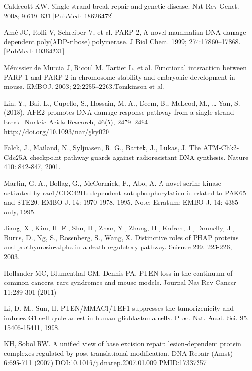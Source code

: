 \documentclass[preprint, 8pt]{elsarticle}
\theoremstyle{definition}
\begin{document}
\begin{thebibliography}{00}
Caldecott KW. 
\newblock Single-strand break repair and genetic disease. 
\newblock Nat Rev Genet. 2008; 9:619–631.[PubMed: 18626472]

Amé JC, Rolli V, Schreiber V, et al. 
\newblock PARP-2, A novel mammalian DNA damage-dependent poly(ADP-ribose) polymerase. 
\newblock J Biol Chem. 1999; 274:17860–17868. [PubMed: 10364231]

Ménissier de Murcia J, Ricoul M, Tartier L, et al. 
\newblock Functional interaction between PARP-1 and PARP-2 in chromosome stability and embryonic development in mouse. 
\newblock EMBOJ. 2003; 22:2255–2263.Tomkinson et al.

 Lin, Y., Bai, L., Cupello, S., Hossain, M. A., Deem, B., McLeod, M., … Yan, S. (2018). 
\newblock APE2 promotes DNA damage response pathway from a single-strand break.
\newblock Nucleic Acids Research, 46(5), 2479–2494. http://doi.org/10.1093/nar/gky020

 Falck, J., Mailand, N., Syljuasen, R. G., Bartek, J., Lukas, J. 
\newblock The ATM-Chk2-Cdc25A checkpoint pathway guards against radioresistant DNA synthesis. 
\newblock Nature 410: 842-847, 2001. 

Martin, G. A., Bollag, G., McCormick, F., Abo, A. 
\newblock A novel serine kinase activated by rac1/CDC42Hs-dependent autophosphorylation is related to PAK65 and STE20. 
\newblock EMBO J. 14: 1970-1978, 1995. Note: Erratum: EMBO J. 14: 4385 only, 1995. 

Jiang, X., Kim, H.-E., Shu, H., Zhao, Y., Zhang, H., Kofron, J., Donnelly, J., Burns, D., Ng, S., Rosenberg, S., Wang, X. 
\newblock Distinctive roles of PHAP proteins and prothymosin-alpha in a death regulatory pathway. 
\newblock Science 299: 223-226, 2003.

Hollander MC, Blumenthal GM, Dennis PA. 
\newblock PTEN loss in the continuum of common cancers, rare syndromes and mouse models.
\newblock Journal Nat Rev Cancer 11:289-301 (2011)

Li, D.-M., Sun, H. 
\newblock PTEN/MMAC1/TEP1 suppresses the tumorigenicity and induces G1 cell cycle arrest in human glioblastoma cells. 
\newblock Proc. Nat. Acad. Sci. 95: 15406-15411, 1998. 

 KH, Sobol RW.
\newblock A unified view of base excision repair: lesion-dependent protein complexes regulated by post-translational modification.
\newblock DNA Repair (Amst) 6:695-711 (2007) DOI:10.1016/j.dnarep.2007.01.009 PMID:17337257


\end{thebibliography}
\end{document}
